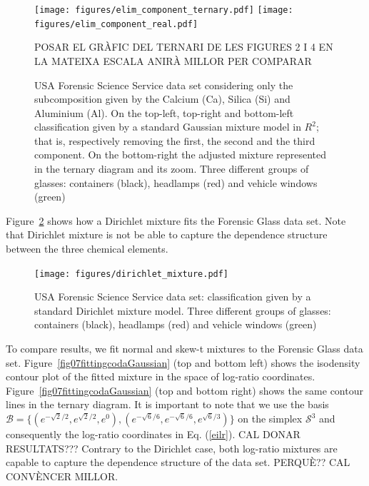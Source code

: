 \documentclass[10pt, a4paper]{article}
\begin{document}
\begin{figure}[htbp]
\centering
\texttt{[image: figures/elim\_component\_ternary.pdf]}
\texttt{[image: figures/elim\_component\_real.pdf]}



\caption{USA Forensic Science Service data set considering only the subcomposition given by the Calcium (Ca), Silica (Si) and Aluminium (Al). On the top-left, top-right and bottom-left classification given by a standard Gaussian mixture model in $R^{2}$; that is, respectively removing the first, the second and the third component. On the bottom-right the adjusted mixture represented in the ternary diagram and its zoom. Three different groups of glasses: containers (black), headlamps (red) and vehicle windows (green)} POSAR EL GR\`{A}FIC DEL TERNARI DE LES FIGURES 2 I 4 EN LA MATEIXA ESCALA ANIR\`{A} MILLOR PER COMPARAR
\label{fig05component_elimination}
\end{figure}



Figure~\ref{fig06fittingdirichlet} shows how a Dirichlet mixture fits
the Forensic Glass data set. Note that Dirichlet mixture is not be able to capture the dependence structure between the three chemical elements. 

\begin{figure}[htbp]
\centering
\texttt{[image: figures/dirichlet\_mixture.pdf]}
\caption{USA Forensic Science Service data set: classification given by a standard Dirichlet mixture model. Three different groups of glasses: containers (black), headlamps (red) and vehicle windows (green)}
\label{fig06fittingdirichlet}
\end{figure}

To compare results, we fit normal and skew-t mixtures to the Forensic Glass data set. Figure~\ref{fig07fittingcodaGaussian} (top and bottom left) shows the isodensity contour plot of the fitted mixture in the space of log-ratio coordinates. Figure~\ref{fig07fittingcodaGaussian} (top and bottom right) shows the same contour lines in the ternary diagram.  It is important to note that we use the basis $\mathcal{B} = \{ (e^{-\sqrt{2}/2}, e^{\sqrt{2}/2}, e^{0}), (e^{-\sqrt{6}/6}, e^{-\sqrt{6}/6}, e^{\sqrt{6}/3}) \}$ on the simplex $\mathcal{S}^3$ and consequently the log-ratio coordinates in Eq. (\ref{eilr}). CAL DONAR RESULTATS??? Contrary to the Dirichlet case, both log-ratio mixtures are capable to capture the dependence structure of the data set. PERQU\`{E}?? CAL CONV\`{E}NCER MILLOR.
\end{document}
